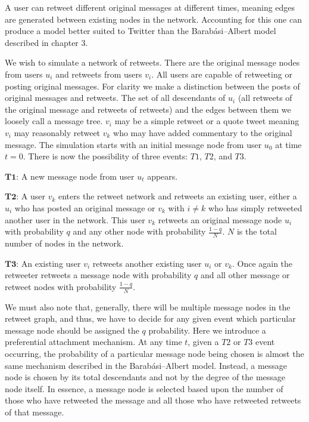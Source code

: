 A user can retweet different original messages at different times, meaning edges are generated between
existing nodes in the network. Accounting for this one can produce
a model better suited to Twitter than the Barabási–Albert model described in chapter 3.

We wish to simulate a network of retweets. There are the original message nodes from users $u_i$ and retweets from users $v_i$. All users
are capable of retweeting or posting original messages. For clarity we make a distinction between the posts of original messages and retweets.
 The set of all descendants of $u_i$ (all retweets of the original message and retweets of retweets) and the edges between them
we loosely call a message tree. $v_i$ may be a simple retweet or a quote tweet meaning $v_i$ may reasonably retweet $v_k$ who may have added commentary to the original message.
 The simulation starts with an initial message node from user $u_{0}$ at time $t=0$. There is now the possibility of three events: $T1$,
$T2$, and $T3$.

\vspace{3mm}
$\pmb{T1}$: A new message node from user $u_t$ appears.

\vspace{3mm}
$\pmb{T2}$: A user $v_k$ enters the retweet network and retweets an existing user, either a $u_i$ who has posted an original message or $v_k$ with $i \neq k$ who
has simply retweeted another user in the network. This user $v_k$ retweets an original message node $u_i$ with 
probability $q$ and any other node with probability $\frac{1-q}{N}$. $N$ is the total number of nodes in the network.

\vspace{3mm}
$\pmb{T3}$: An existing user $v_i$ retweets another existing user $u_i$ or $v_k$. Once again the retweeter retweets a message node with probability 
$q$ and all other message or retweet nodes with probability $\frac{1-q}{N}$.

We must also note that, generally, there will be multiple message nodes in the retweet graph, and thus,
 we have to decide for any given event
which particular message node should be assigned the $q$ probability.
 Here we introduce a preferential attachment mechanism. At any time $t$,
given a $T2$ or $T3$ event occurring, the probability of a particular message node being chosen is almost the
same mechanism described in the Barabási–Albert model. Instead, a message node is chosen
by its total descendants and not by the degree of the message node itself. In essence, a message node
is selected based upon the number of those who have retweeted the message and all those who have retweeted
retweets of that message.


